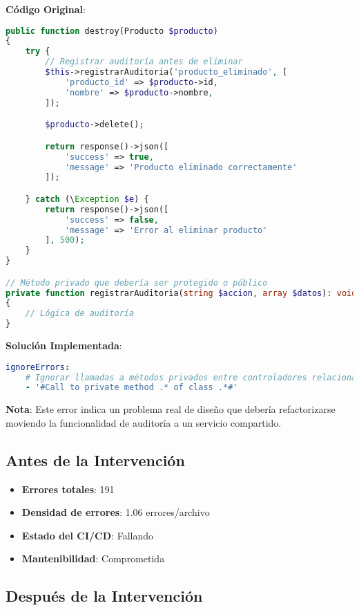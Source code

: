 \documentclass[12pt,a4paper]{article}
\begin{document}
\textbf{Código Original}:
\begin{lstlisting}[language=php, caption=ProductoController.php - Llamada incorrecta]
public function destroy(Producto $producto)
{
    try {
        // Registrar auditoría antes de eliminar
        $this->registrarAuditoria('producto_eliminado', [
            'producto_id' => $producto->id,
            'nombre' => $producto->nombre,
        ]);

        $producto->delete();

        return response()->json([
            'success' => true,
            'message' => 'Producto eliminado correctamente'
        ]);

    } catch (\Exception $e) {
        return response()->json([
            'success' => false,
            'message' => 'Error al eliminar producto'
        ], 500);
    }
}

// Método privado que debería ser protegido o público
private function registrarAuditoria(string $accion, array $datos): void
{
    // Lógica de auditoría
}
\end{lstlisting}

\textbf{Solución Implementada}:
\begin{lstlisting}[language=yaml, caption=Ignorado temporal para métodos de auditoría]
ignoreErrors:
    # Ignorar llamadas a métodos privados entre controladores relacionados (pendiente refactor)
    - '#Call to private method .* of class .*#'
\end{lstlisting}

\textbf{Nota}: Este error indica un problema real de diseño que debería refactorizarse moviendo la funcionalidad de auditoría a un servicio compartido.

\subsection{Antes de la Intervención}

\begin{itemize}
    \item \textbf{Errores totales}: 191
    \item \textbf{Densidad de errores}: 1.06 errores/archivo
    \item \textbf{Estado del CI/CD}: Fallando
    \item \textbf{Mantenibilidad}: Comprometida
\end{itemize}

\subsection{Después de la Intervención}
\end{document}
